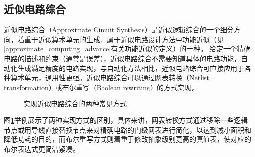 \subsection{近似电路综合}

近似电路综合（Approximate Circuit Synthesis）\cite{AC:ALS:survey}是近似逻辑综合的一个细分方向，着重于近似算术单元的生成，属于近似电路设计方法中功能近似（见\ref{approximate_computing_advance}有关功能近似的定义）的一种。
给定一个精确电路的描述和约束（通常是误差），近似电路综合不需要知道具体的电路功能，自动化生成满足精度的电路实现，与自动化方法相比，近似电路综合可直接应用于各种算术单元，通用性更强。近似电路综合可以通过网表转换（Netlist transformation）或布尔重写（Boolean rewriting）的方式实现，
\begin{figure}[!htb]
    \centering
\caption{实现近似电路综合的两种常见方式}
\label{AC:ALS:survey_ACS_two_methods}
\end{figure}
图\ref{AC:ALS:survey_ACS_two_methods}举例展示了两种实现方式的区别，具体来讲，网表转换方式通过移除一些逻辑节点或用导线直接替换节点来对精确电路的门级网表进行简化，以达到减小面积和降低功耗的目的，而布尔重写方式则着重于修改抽象级别更高的真值表，使对应的布尔表达式更简洁紧凑。

